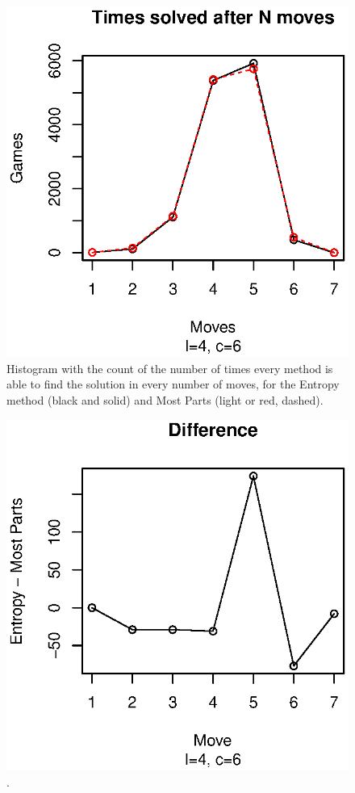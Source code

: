 \documentclass[preprint,12pt]{elsarticle}
\begin{document}
\begin{figure}[!htb]
\centering
\includegraphics{histo-me.eps}
\caption{Histogram with the count of the number of times every method
  is able to find the solution in every number of moves, for the
  Entropy method (black and solid) and Most Parts (light or red, dashed). \label{fig:histo:me}}
\end{figure} 
%
\begin{figure}[!htb]
\centering
\includegraphics{dif-46.eps}
\caption{. \label{fig:dif:me}}
\end{figure}
\end{document}
